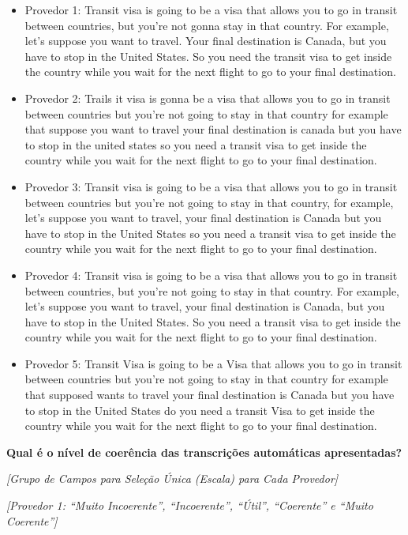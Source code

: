 \begin{itemize}
    \item Provedor 1: Transit visa is going to be a visa that allows you to go in transit between countries, but you're not gonna stay in that country. For example, let's suppose you want to travel. Your final destination is Canada, but you have to stop in the United States. So you need the transit visa to get inside the country while you wait for the next flight to go to your final destination.
    \item Provedor 2: Trails it visa is gonna be a visa that allows you to go in transit between countries but you're not going to stay in that country for example that suppose you want to travel your final destination is canada but you have to stop in the united states so you need a transit visa to get inside the country while you wait for the next flight to go to your final destination.
    \item Provedor 3: Transit visa is going to be a visa that allows you to go in transit between countries but you're not going to stay in that country, for example, let's suppose you want to travel, your final destination is Canada but you have to stop in the United States so you need a transit visa to get inside the country while you wait for the next flight to go to your final destination.
    \item Provedor 4: Transit visa is going to be a visa that allows you to go in transit between countries, but you're not going to stay in that country. For example, let's suppose you want to travel, your final destination is Canada, but you have to stop in the United States. So you need a transit visa to get inside the country while you wait for the next flight to go to your final destination.
    \item Provedor 5: Transit Visa is going to be a Visa that allows you to go in transit between countries but you're not going to stay in that country for example that supposed wants to travel your final destination is Canada but you have to stop in the United States do you need a transit Visa to get inside the country while you wait for the next flight to go to your final destination.
\end{itemize}

\noindent
\textbf{Qual é o nível de coerência das transcrições automáticas apresentadas?}

\noindent
\textit{[Grupo de Campos para Seleção Única (Escala) para Cada Provedor]}

\noindent
\textit{[Provedor 1: ``Muito Incoerente'', ``Incoerente'', ``Útil'', ``Coerente'' e ``Muito Coerente'']}

